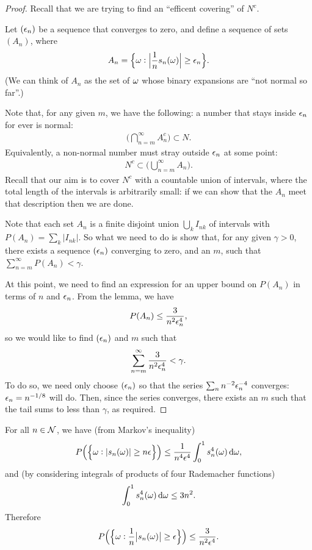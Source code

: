 \begin{proof}
  Recall that we are trying to find an ``efficent covering​'' of $N^c$.

  Let $(\epsilon_n)$ be a sequence that converges to zero, and define a sequence of sets $(A_n)$,
  where
  \begin{align*}
    A_n = \Big\{\omega : \Big|\frac{1}{n} s_n(\omega)\Big| \geq \epsilon_n\Big\}.
  \end{align*}
  (We can think of $A_n$ as the set of $\omega$ whose binary expansions are ``not normal so far​''.)

  Note that, for any given $m$, we have the following: a number that stays inside $\epsilon_n$ for ever is normal:
  \begin{align*}
    \Big(\bigcap_{n=m}^\infty A_n^c\Big) \subset N.
  \end{align*}
  Equivalently, a non-normal number must stray outside $\epsilon_n$ at some point:
  \begin{align*}
    N^c \subset \Big(\bigcup_{n=m}^\infty A_n\Big).
  \end{align*}
  Recall that our aim is to cover $N^c$ with a countable union of intervals, where the total length of the
  intervals is arbitrarily small: if we can show that the $A_n$ meet that description then we are done.

  Note that each set $A_n$ is a finite disjoint union $\bigcup_{k}I_{nk}$ of intervals
  with $P(A_n) = \sum_k |I_{nk}|$. So what we need to do is show that, for any given $\gamma > 0$, there exists
  a sequence $(\epsilon_n)$ converging to zero, and an $m$, such that $\sum_{n=m}^\infty P(A_n) < \gamma$.

  At this point, we need to find an expression for an upper bound on $P(A_n)$ in terms of $n$ and $\epsilon_n$.
  From the lemma, we have
  \begin{align*}
    P(A_n) \leq \frac{3}{n^2\epsilon_n^4},
  \end{align*}
  so we would like to find $(\epsilon_n)$ and $m$ such that
  \begin{align*}
    \sum_{n=m}^\infty \frac{3}{n^2\epsilon_n^4} < \gamma.
  \end{align*}
  To do so, we need only choose $(\epsilon_n)$ so that the series $\sum_nn^{-2}\epsilon_n^{-4}$
  converges: $\epsilon_n = n^{-1/8}$ will do. Then, since the series converges, there exists an $m$ such that the
  tail sums to less than $\gamma$, as required.
\end{proof}

\begin{lemma}
  For all $n \in \mathcal{N}$, we have (from Markov's inequality)
  \begin{align*}
    P\Big(\Big\{ \om : |s_n(\om)| \geq n\eps  \Big\}\Big) \leq \frac{1}{n^4\eps^4} \int_0^1 s_n^4(\om) \d\om,
  \end{align*}
  and (by considering integrals of products of four Rademacher functions)
  \begin{align*}
    \int_0^1 s_n^4(\om) \d\om \leq 3n^2.
  \end{align*}
  Therefore
  \begin{align*}
    P\Big(\Big\{ \omega : \frac{1}{n}\big|s_n(\omega)\big| \geq \epsilon  \Big\}\Big) \leq \frac{3}{n^2\epsilon^4}.
  \end{align*}
\end{lemma}